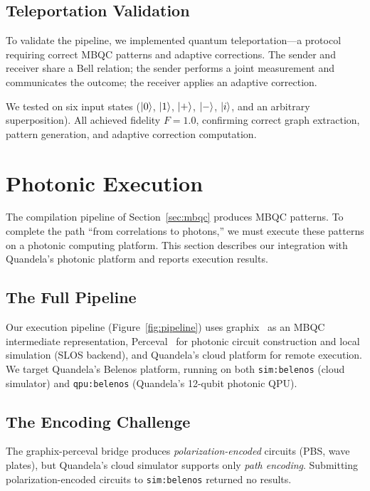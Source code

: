 \documentclass[submission,copyright,creativecommons]{eptcs}
\newcommand{\mbqc}{\textsc{MBQC}}
\begin{document}
\subsection{Teleportation Validation}

To validate the pipeline, we implemented quantum teleportation---a protocol
requiring correct \mbqc{} patterns and adaptive corrections. The sender and
receiver share a Bell relation; the sender performs a joint measurement and
communicates the outcome; the receiver applies an adaptive correction.

We tested on six input states ($\ket{0}$, $\ket{1}$, $\ket{+}$, $\ket{-}$,
$\ket{i}$, and an arbitrary superposition). All achieved fidelity $F = 1.0$,
confirming correct graph extraction, pattern generation, and adaptive
correction computation.


\section{Photonic Execution}
\label{sec:photonic}

The compilation pipeline of Section~\ref{sec:mbqc} produces \mbqc{} patterns.
To complete the path ``from correlations to photons,'' we must execute these
patterns on a photonic computing platform. This section describes our integration with
Quandela's photonic platform and reports execution results.

\subsection{The Full Pipeline}

Our execution pipeline (Figure~\ref{fig:pipeline}) uses
graphix~\cite{graphix} as an \mbqc{} intermediate representation,
Perceval~\cite{perceval} for photonic circuit construction and local
simulation (SLOS backend), and Quandela's cloud platform for remote
execution. We target Quandela's Belenos platform, running on both
\texttt{sim:belenos} (cloud simulator) and \texttt{qpu:belenos}
(Quandela's 12-qubit photonic QPU).

\subsection{The Encoding Challenge}

The graphix-perceval bridge produces \emph{polarization-encoded} circuits
(PBS, wave plates), but Quandela's cloud simulator supports only
\emph{path encoding}. Submitting polarization-encoded circuits to
\texttt{sim:belenos} returned no results.
\end{document}
